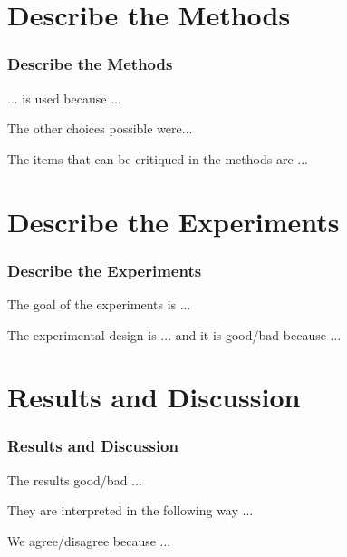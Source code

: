 \documentclass{beamer}
\begin{document}
\section{Describe the Methods}
\begin{frame}
\frametitle{Describe the Methods}
... is used because ...

The other choices possible were...

The items that can be critiqued in the methods are ...

\end{frame}

\section{Describe the Experiments}
\begin{frame}
\frametitle{Describe the Experiments}
The goal of the experiments is ...

The experimental design is ... and it is good/bad because ...

\end{frame}

\section{Results and Discussion}
\begin{frame}
\frametitle{Results and Discussion}
The results good/bad ...

They are interpreted in the following way ...

We agree/disagree because ...

\end{frame}
\end{document}

